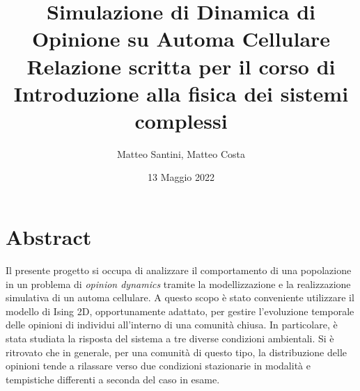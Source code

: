 \documentclass[letterpaper,10pt]{article}
\begin{document}
\title{\Huge Simulazione di Dinamica di Opinione su Automa Cellulare 
		\[\]\Large Relazione scritta per il corso di \\ Introduzione alla fisica dei sistemi complessi \medskip
		}
\author{Matteo Santini, Matteo Costa}
\date{13 Maggio 2022}

\maketitle
\tableofcontents
\bigskip

 \section{Abstract}
Il presente progetto si occupa di analizzare il comportamento di una popolazione in un problema di \textit{opinion dynamics} tramite la modellizzazione e la realizzazione simulativa di un automa cellulare. A questo scopo è stato conveniente utilizzare il modello di Ising 2D, opportunamente adattato, per gestire l'evoluzione temporale delle opinioni di individui all'interno di una comunità chiusa. In particolare, è stata studiata la risposta del sistema a tre diverse condizioni ambientali. Si è ritrovato che in generale, per una comunità di questo tipo, la distribuzione delle opinioni tende a rilassare verso due condizioni stazionarie in modalità e tempistiche differenti a seconda del caso in esame.
\end{document}
